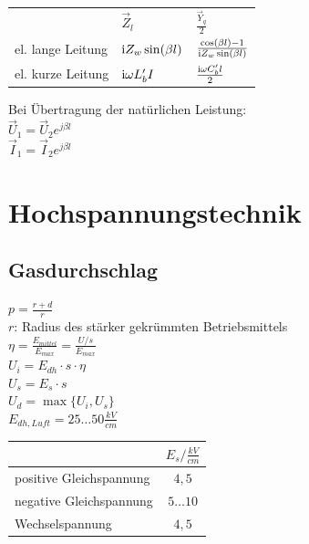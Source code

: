 \documentclass[fs, footer]{latex4ei}
\begin{document}
\begin{multicols}{4}
		
		\begin{tabular}{lll}
		& $\vec Z_l$ & $\frac{\vec Y_q}{2}$\\[0.5em] \mrule
		el. lange Leitung & $\mathrm{i} Z_w \sin(\beta l)$ & $\frac{\cos(\beta l) -1}{\mathrm{i} Z_w \sin(\beta l)}$\\[0.5em]
		el. kurze Leitung & $\mathrm{i} \omega L'_b I$ & $\frac{\mathrm{i} \omega C'_b l}{2}$\\[0.5em]
		\end{tabular}
		
		Bei Übertragung der natürlichen Leistung: \\
		$\vec U_1 = \vec U_2 e^{j \beta l}$ \\
		$\vec I_1 = \vec I_2 e^{j \beta l}$ \\


	\section{Hochspannungstechnik}
		\subsection{Gasdurchschlag}
		$p = \frac{r + d}{r}$ \\
		$r$: Radius des stärker gekrümmten Betriebsmittels \\
		$\eta = \frac{E_{mittel}}{E_{max}} = \frac{U/s}{E_{max}}$ \\
		$U_i = E_{dh} \cdot s \cdot \eta$ \\
		$U_s = E_s \cdot s$ \\
		$U_d = \max\{U_i, U_s\}$ \\
		$E_{dh,Luft} = 25 \hdots 50 \frac{kV}{cm}$ \\
		\begin{tabular}{l|c}
		 & $E_s / \frac{kV}{cm}$ \\ \hline
		 positive Gleichspannung & $4,5$ \\ \hline
		 negative Gleichspannung & $5 \hdots 10$ \\ \hline
		 Wechselspannung & $4,5$
		\end{tabular}


\end{multicols}
\end{document}
